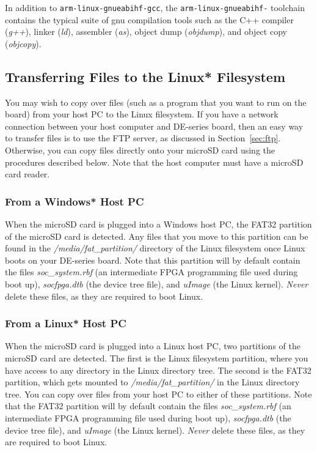 \documentclass[11pt, twoside, pdftex]{article}
\begin{document}
In addition to \texttt{arm-linux-gnueabihf-gcc}, the \texttt{arm-linux-gnueabihf-} toolchain 
contains the typical suite of gnu compilation tools such as the C++ compiler (\textit{g++}), 
linker (\textit{ld}), assembler (\textit{as}), object dump (\textit{objdump}), and object 
copy (\textit{objcopy}).

\subsection*{Transferring Files to the Linux* Filesystem}
\label{sec:transfer_files}

You may wish to copy over files (such as a program that you want to run on the board) from 
your host PC to the Linux filesystem. If you have a network connection between your host
computer and DE-series board, then an easy way to transfer files is to use the FTP server,
as discussed in Section~\ref{sec:ftp}. Otherwise, you can copy files directly onto your
microSD card using the procedures described below. Note that the host computer must have a 
microSD card reader.

\subsubsection*{From a Windows* Host PC}

When the microSD card is plugged into a Windows host PC, the FAT32 partition of the
microSD card is detected. Any files that you move to this partition can be found in the
\textit{/media/fat\_partition/} directory of the Linux filesystem once Linux boots on your
DE-series board. Note that this partition will by default contain the files
\textit{soc\_system.rbf} (an intermediate FPGA programming file used during boot up),
\textit{socfpga.dtb} (the device tree file), and \textit{uImage} (the Linux kernel). {\it Never}
delete these files, as they are required to boot Linux.

\subsubsection*{From a Linux* Host PC}

When the microSD card is plugged into a Linux host PC, two partitions of the microSD card
are detected. The first is the Linux filesystem partition, where you have access to any
directory in the Linux directory tree. The second is the FAT32 partition, which gets
mounted to \textit{/media/fat\_partition/} in the Linux directory tree. You can copy over
files from your host PC to either of these partitions. Note that the FAT32 partition will
by default contain the files \textit{soc\_system.rbf} (an intermediate FPGA programming
file used during boot up), \textit{socfpga.dtb} (the device tree file), and
\textit{uImage} (the Linux kernel). {\it Never} delete these files, as they are required to boot Linux. 
\end{document}
